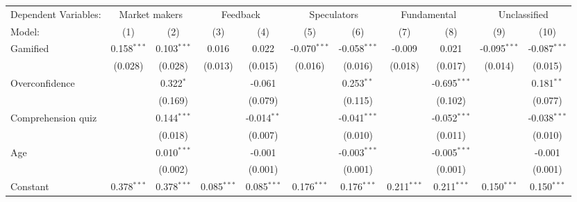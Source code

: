 \begin{tabular}{lcccccccccc}
   \tabularnewline \midrule \midrule
   Dependent Variables: & \multicolumn{2}{c}{Market makers} & \multicolumn{2}{c}{Feedback} & \multicolumn{2}{c}{Speculators} & \multicolumn{2}{c}{Fundamental} & \multicolumn{2}{c}{Unclassified}\\
   Model:              & (1)           & (2)           & (3)           & (4)           & (5)            & (6)            & (7)           & (8)            & (9)            & (10)\\  
   \midrule
   Gamified            & 0.158$^{***}$ & 0.103$^{***}$ & 0.016         & 0.022         & -0.070$^{***}$ & -0.058$^{***}$ & -0.009        & 0.021          & -0.095$^{***}$ & -0.087$^{***}$\\   
                       & (0.028)       & (0.028)       & (0.013)       & (0.015)       & (0.016)        & (0.016)        & (0.018)       & (0.017)        & (0.014)        & (0.015)\\   
   Overconfidence      &               & 0.322$^{*}$   &               & -0.061        &                & 0.253$^{**}$   &               & -0.695$^{***}$ &                & 0.181$^{**}$\\   
                       &               & (0.169)       &               & (0.079)       &                & (0.115)        &               & (0.102)        &                & (0.077)\\   
   Comprehension quiz  &               & 0.144$^{***}$ &               & -0.014$^{**}$ &                & -0.041$^{***}$ &               & -0.052$^{***}$ &                & -0.038$^{***}$\\   
                       &               & (0.018)       &               & (0.007)       &                & (0.010)        &               & (0.011)        &                & (0.010)\\   
   Age                 &               & 0.010$^{***}$ &               & -0.001        &                & -0.003$^{***}$ &               & -0.005$^{***}$ &                & -0.001\\   
                       &               & (0.002)       &               & (0.001)       &                & (0.001)        &               & (0.001)        &                & (0.001)\\   
   Constant            & 0.378$^{***}$ & 0.378$^{***}$ & 0.085$^{***}$ & 0.085$^{***}$ & 0.176$^{***}$  & 0.176$^{***}$  & 0.211$^{***}$ & 0.211$^{***}$  & 0.150$^{***}$  & 0.150$^{***}$\\   

\end{tabular}
